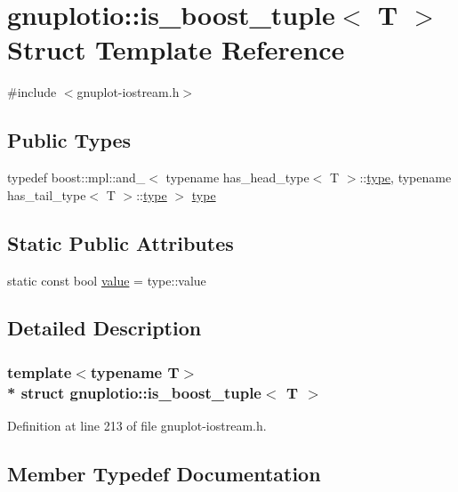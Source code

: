 \hypertarget{structgnuplotio_1_1is__boost__tuple}{}\section{gnuplotio\+:\+:is\+\_\+boost\+\_\+tuple$<$ T $>$ Struct Template Reference}
\label{structgnuplotio_1_1is__boost__tuple}


{\ttfamily \#include $<$gnuplot-\/iostream.\+h$>$}

\subsection*{Public Types}
\begin{DoxyCompactItemize}
\item 
typedef boost\+::mpl\+::and\+\_\+$<$ typename has\+\_\+head\+\_\+type$<$ T $>$\+::\hyperlink{structgnuplotio_1_1is__boost__tuple_ad771f62833b23ecae5dc689e6248396a}{type}, typename has\+\_\+tail\+\_\+type$<$ T $>$\+::\hyperlink{structgnuplotio_1_1is__boost__tuple_ad771f62833b23ecae5dc689e6248396a}{type} $>$ \hyperlink{structgnuplotio_1_1is__boost__tuple_ad771f62833b23ecae5dc689e6248396a}{type}
\end{DoxyCompactItemize}
\subsection*{Static Public Attributes}
\begin{DoxyCompactItemize}
\item 
static const bool \hyperlink{structgnuplotio_1_1is__boost__tuple_ae6664b02421d28585204104af65a4744}{value} = type\+::value
\end{DoxyCompactItemize}


\subsection{Detailed Description}
\subsubsection*{template$<$typename T$>$\\*
struct gnuplotio\+::is\+\_\+boost\+\_\+tuple$<$ T $>$}



Definition at line 213 of file gnuplot-\/iostream.\+h.



\subsection{Member Typedef Documentation}
